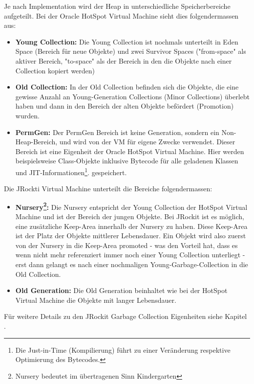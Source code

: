 Je nach Implementation wird der Heap in unterschiedliche Speicherbereiche aufgeteilt. Bei der Oracle HotSpot Virtual Machine sieht dies folgendermassen aus\cite{langerkreft201003}:

\begin{itemize}
	\item \textbf{Young Collection:} Die Young Collection ist nochmals unterteilt in Eden Space (Bereich für neue Objekte) und zwei Survivor Spaces ("from-space" als aktiver Bereich, "to-space" als der Bereich in den die Objekte nach einer Collection kopiert werden)
	\item \textbf{Old Collection:} In der Old Collection befinden sich die Objekte, die eine gewisse Anzahl an Young-Generation Collections (Minor Collections) überlebt haben und dann in den Bereich der alten Objekte befördert (Promotion) wurden.
	\item  \textbf{PermGen:} Der PermGen Bereich ist keine Generation, sondern ein Non-Heap-Bereich, und wird von der VM für eigene Zwecke verwendet. Dieser Bereich ist eine Eigenheit der Oracle HotSpot Virtual Machine. Hier werden beispielsweise Class-Objekte inklusive Bytecode für alle geladenen Klassen und JIT-Informationen\footnote{Die Just-in-Time (Kompilierung) führt zu einer Veränderung respektive Optimierung des Bytecodes.}. gespeichert.
\end{itemize}

Die JRockti Virtual Machine unterteilt die Bereiche folgendermassen:
\begin{itemize}
	\item \textbf{Nursery\footnote{Nursery bedeutet im übertragenen Sinn Kindergarten}:} Die Nursery entspricht der Young Collection der HotSpot Virtual Machine und ist der Bereich der jungen Objekte. Bei JRockit ist es möglich, eine zusätzliche Keep-Area innerhalb der Nursery zu haben. Diese Keep-Area ist der Platz der Objekte mittlerer Lebensdauer. Ein Objekt wird also zuerst von der Nursery in die Keep-Area promoted - was den Vorteil hat, dass es wenn nicht mehr referenziert immer noch einer Young Collection unterliegt - erst dann gelangt es nach einer nochmaligen Young-Garbage-Collection in die Old Collection.
	\item \textbf{Old Generation: } Die Old Generation beinhaltet wie bei der HotSpot Virtual Machine die Objekte mit langer Lebensdauer.
\end{itemize}
Für weitere Details zu den JRockit Garbage Collection Eigenheiten siehe Kapitel .


